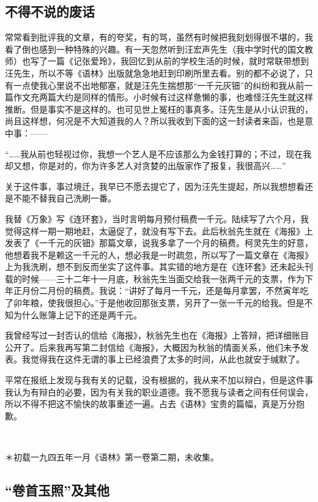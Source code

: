 \subsection{不得不说的废话}

\par 常常看到批评我的文章，有的夸奖，有的骂，虽然有时候把我刻划得很不堪的，我看了倒也感到一种特殊的兴趣。有一天忽然听到汪宏声先生（我中学时代的国文教师）也写了一篇《记张爱玲》，我回忆到从前的学校生活的时候，就时常联带想到汪先生，所以不等《语林》出版就急急地赶到印刷所里去看。别的都不必说了，只有一点使我心里说不出地郁塞，就是汪先生揣想那“一千元灰钿”的纠纷和我从前一篇作文充两篇大约是同样的情形。小时候有过这样惫懒的事，也难怪汪先生就这样推断。但是事实不是这样的。也可见世上冤枉的事真多。汪先生是从小认识我的，尚且这样想，何况是不大知道我的人？所以我收到下面的这一封读者来函，也是意中事：——
\par “……我从前也轻视过你，我想一个艺人是不应该那么为金钱打算的；不过，现在我却又想，你是对的，你为许多艺人对贪婪的出版家作了报复，我很高兴……”
\par 关于这件事，事过境迁，我早已不愿去提它了，因为汪先生提起，所以我想想看还是不能不替我自己洗刷一番。
\par 我替《万象》写《连环套》，当时言明每月预付稿费一千元。陆续写了六个月，我觉得这样一期一期地赶，太逼促了，就没有写下去。此后秋翁先生就在《海报》上发表了《一千元的灰钿》那篇文章，说我多拿了一个月的稿费。柯灵先生的好意，他想着我不是赖这一千元的人，想必我是一时疏忽，所以写了一篇文章在《海报》上为我洗刷，想不到反而坐实了这件事。其实错的地方是在《连环套》还未起头刊载的时候——三十二年十一月底，秋翁先生当面交给我一张两千元的支票，作为下年正月份二月份的稿费。我说：“讲好了每月一千元，还是每月拿罢，不然寅年吃了卯年粮，使我很担心。”于是他收回那张支票，另开了一张一千元的给我。但是不知为什么账簿上记下的还是两千元。
\par 我曾经写过一封否认的信给《海报》，秋翁先生也在《海报》上答辩，把详细账目公开了。后来我再写第二封信给《海报》，大概因为秋翁的情面关系，他们未予发表。我觉得我在这件无谓的事上已经浪费了太多的时间，从此也就安于缄默了。
\par 平常在报纸上发现与我有关的记载，没有根据的，我从来不加以辩白，但是这件事我认为有辩白的必要，因为有关我的职业道德。我不愿我与读者之间有任何误会，所以不得不把这不愉快的故事重述一遍。占去《语林》宝贵的篇幅，真是万分抱歉。
\par  
\par ＊初载一九四五年一月《语林》第一卷第二期，未收集。


\subsection{“卷首玉照”及其他}

